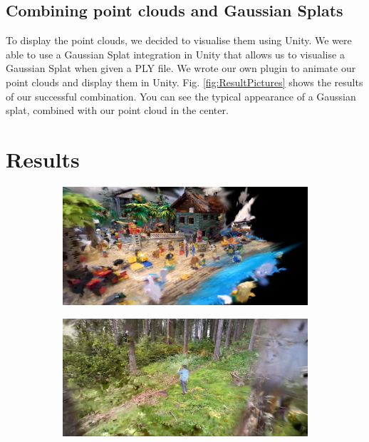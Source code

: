 \documentclass[conference]{IEEEtran}
\begin{document}
\subsection{Combining point clouds and Gaussian Splats}
To display the point clouds, we decided to visualise them using Unity. We were able to use a Gaussian Splat integration in Unity that allows us to visualise a Gaussian Splat when given a PLY file. We wrote our own plugin to animate our point clouds and display them in Unity. Fig. \ref{fig:ResultPictures} shows the results of our successful combination. You can see the typical appearance of a Gaussian splat, combined with our point cloud in the center.
\section{Results}
\begin{figure}[h]
    \begin{subfigure}{.24\textwidth}
    \includegraphics[width=\linewidth]{Pictures/ResPic1.png}
    \end{subfigure}
    \begin{subfigure}{.24\textwidth}
    \includegraphics[width=\linewidth]{Pictures/ResPic2.png}
    \end{subfigure}
    \begin{subfigure}{.24\textwidth}

\end{subfigure}
\end{figure}
\end{document}
